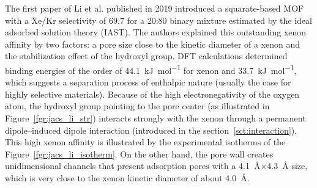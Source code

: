 \documentclass[main]{subfiles}
\begin{document}
The first paper of Li et al.\autocite{Li_2019} published in 2019 introduced a squarate-based MOF with a Xe/Kr selectivity of $69.7$ for a 20:80 binary mixture estimated by the ideal adsorbed solution theory (IAST)\autocite{Cessford_2012}. The authors explained this outstanding xenon affinity by two factors: a pore size close to the kinetic diameter of a xenon and the stabilization effect of the hydroxyl group. DFT calculations determined binding energies of the order of \SI{44.1}{\kJ\per\mole} for xenon and \SI{33.7}{\kJ\per\mole}, which suggests a separation process of enthalpic nature (usually the case for highly selective materials). Because of the high electronegativity of the oxygen atom, the hydroxyl group pointing to the pore center (as illustrated in Figure~\ref{fgr:jacs_li_str}) interacts strongly with the xenon through a permanent dipole--induced dipole interaction (introduced in the section~\ref{sct:interaction}). This high xenon affinity is illustrated by the experimental isotherms of the Figure~\ref{fgr:jacs_li_isotherm}. On the other hand, the pore wall creates unidimensional channels that present adsorption pores with a \SI{4.1}{\angstrom}$\times$\SI{4.3}{\angstrom} size, which is very close to the xenon kinetic diameter of about \SI{4.0}{\angstrom}. 
\end{document}
